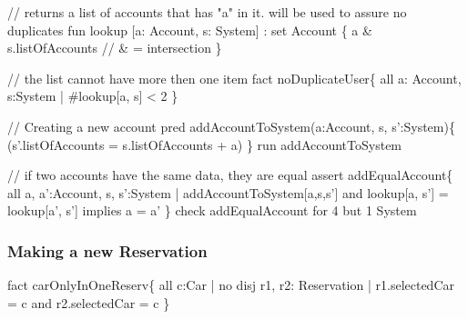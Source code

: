 \documentclass[a4paper]{article}
\begin{document}
// returns a list of accounts that has "a" in it. will be used to assure no duplicates  \newline
fun lookup [a: Account, s: System] : set Account \{  \newline
\hspace*{5 mm}	a \& s.listOfAccounts // \& = intersection  \newline
\} \newline

// the list cannot have more then one item  \newline
fact noDuplicateUser\{  \newline
\hspace*{5 mm}	all a: Account, s:System |  \newline
\hspace*{5 mm}	\#lookup[a, s] < 2  \newline
\}  \newline

// Creating a new account  \newline
pred addAccountToSystem(a:Account, s, s':System)\{  \newline
\hspace*{5 mm}	(s'.listOfAccounts = s.listOfAccounts + a)  \newline
\}  \newline
run addAccountToSystem  \newline

// if two accounts have the same data, they are equal  \newline  
assert addEqualAccount\{  \newline
\hspace*{5 mm}	all a, a':Account, s, s':System |  \newline
\hspace*{5 mm}		addAccountToSystem[a,s,s'] and lookup[a, s'] = lookup[a', s']  \newline
\hspace*{5 mm}		implies  \newline
\hspace*{5 mm}		a = a'   \newline		
\}  \newline
check addEqualAccount for 4 but 1 System  \newline

\rmfamily
\subsubsection{Making a new Reservation}
\ttfamily
fact carOnlyInOneReserv\{ \newline
\hspace*{5 mm}	all c:Car | no disj r1, r2: Reservation | \newline
\hspace*{5 mm}		r1.selectedCar = c and r2.selectedCar = c \newline
\} \newline
\end{document}
